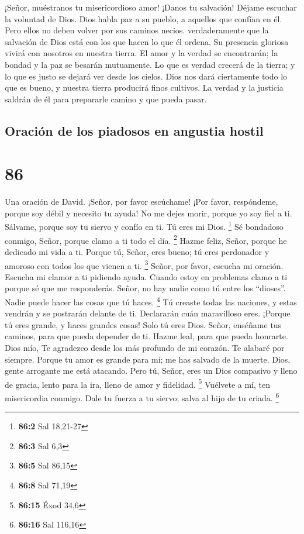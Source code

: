  ¡Señor, muéstranos tu misericordioso amor! ¡Danos tu
salvación!  Déjame escuchar la voluntad de Dios. Dios habla
paz a su pueblo, a aquellos que confían en él. Pero ellos no deben
volver por sus caminos necios.  verdaderamente que la
salvación de Dios está con los que hacen lo que él ordena. Su presencia
gloriosa vivirá con nosotros en nuestra tierra.  El amor y
la verdad se encontrarán; la bondad y la paz se besarán mutuamente.
 Lo que es verdad crecerá de la tierra; y lo que es justo
se dejará ver desde los cielos.  Dios nos dará ciertamente
todo lo que es bueno, y nuestra tierra producirá finos cultivos.
 La verdad y la justicia saldrán de él para prepararle
camino y que pueda pasar.

\hypertarget{oraciuxf3n-de-los-piadosos-en-angustia-hostil}{%
\subsection{Oración de los piadosos en angustia
hostil}\label{oraciuxf3n-de-los-piadosos-en-angustia-hostil}}

\hypertarget{section-85}{%
\section{86}\label{section-85}}

Una oración de David.  ¡Señor, por favor escúchame! ¡Por
favor, respóndeme, porque soy débil y necesito tu ayuda!  No
me dejes morir, porque yo soy fiel a ti. Sálvame, porque soy tu siervo y
confío en ti. Tú eres mi Dios. \footnote{\textbf{86:2} Sal 18,21-27}
 Sé bondadoso conmigo, Señor, porque clamo a ti todo el día.
\footnote{\textbf{86:3} Sal 6,3}  Hazme feliz, Señor, porque
he dedicado mi vida a ti.  Porque tú, Señor, eres bueno; tú
eres perdonador y amoroso con todos los que vienen a ti. \footnote{\textbf{86:5}
  Sal 86,15}  Señor, por favor, escucha mi oración. Escucha
mi clamor a ti pidiendo ayuda.  Cuando estoy en problemas
clamo a ti porque sé que me responderás.  Señor, no hay
nadie como tú entre los ``dioses''. Nadie puede hacer las cosas que tú
haces. \footnote{\textbf{86:8} Sal 71,19}  Tú creaste todas
las naciones, y estas vendrán y se postrarán delante de ti. Declararán
cuán maravilloso eres.  ¡Porque tú eres grande, y haces
grandes cosas! Solo tú eres Dios.  Señor, enséñame tus
caminos, para que pueda depender de ti. Hazme leal, para que pueda
honrarte.  Dios mío, Te agradezco desde los más profundo de
mi corazón. Te alabaré por siempre.  Porque tu amor es
grande para mí; me has salvado de la muerte.  Dios, gente
arrogante me está atacando.  Pero tú, Señor, eres un Dios
compasivo y lleno de gracia, lento para la ira, lleno de amor y
fidelidad. \footnote{\textbf{86:15} Éxod 34,6}  Vuélvete a
mí, ten misericordia conmigo. Dale tu fuerza a tu siervo; salva al hijo
de tu criada. \footnote{\textbf{86:16} Sal 116,16}

